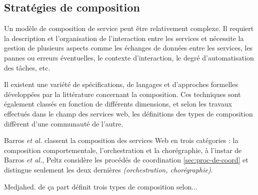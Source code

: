     \subsection{Stratégies de composition}
    \label{sec:types-de-composition}
    Un modèle de composition de service peut être relativement
    complexe. Il requiert la description et l'organisation de
    l'interaction entre les services et nécessite la gestion de
    plusieurs aspects comme les échanges de données entre les
    services, les pannes ou erreurs éventuelles, le contexte
    d'interaction, le degré d'automatisation des tâches, etc.
    
    Il existent une variété de spécifications, de langages et
    d'approches formelles développées par la littérature concernant la
    composition. Ces techniques sont également classés en fonction de
    différents dimensions, et selon les travaux effectués dans le
    champ des services web, les définitions des types de composition
    diffèrent d'une communauté de l'autre.
 
    Barros \emph{et al.} \cite{barros2006standards} classent la
    composition des services Web en trois catégories : la composition
    comportementale, l'orchestration et la chorégraphie, à l'instar de
    Barros \emph{et al.}, Peltz \cite{peltz2003web} considère les
    procédés de coordination \ref{sec:proc-de-coord} et distingue
    seulement les deux dernières \textit{(orchestration,
      chorégraphie)}.

    
    \newpage
    Medjahed.\cite{medjahed2004thesis} de ça part définit trois types
    de composition selon...


